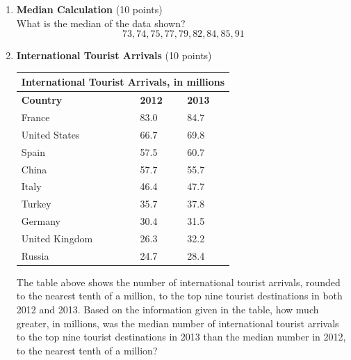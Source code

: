 \begin{enumerate}
  \newpage

  \item \textbf{Median Calculation} (10 points)\\
  What is the median of the data shown?\\
  $$73,74,75,77,79,82,84,85,91$$
  \begin{subanswer}
  \end{subanswer}

  \item \textbf{International Tourist Arrivals} (10 points)\\
  \begin{center}
  \begin{tabular}{|l|l|l|}
  \hline
  \multicolumn{3}{|c|}{International Tourist Arrivals, in millions} \\
  \hline
  \textbf{Country} & \textbf{2012} & \textbf{2013} \\
  \hline
  France & 83.0 & 84.7 \\
  \hline
  United States & 66.7 & 69.8 \\
  \hline
  Spain & 57.5 & 60.7 \\
  \hline
  China & 57.7 & 55.7 \\
  \hline
  Italy & 46.4 & 47.7 \\
  \hline
  Turkey & 35.7 & 37.8 \\
  \hline
  Germany & 30.4 & 31.5 \\
  \hline
  United Kingdom & 26.3 & 32.2 \\
  \hline
  Russia & 24.7 & 28.4 \\
  \hline
  \end{tabular}
  \end{center}

  The table above shows the number of international tourist arrivals, rounded to the nearest tenth of a million, to the top nine tourist destinations in both 2012 and 2013. Based on the information given in the table, how much greater, in millions, was the median number of international tourist arrivals to the top nine tourist destinations in 2013 than the median number in 2012, to the nearest tenth of a million?
  \begin{subanswer}
  \end{subanswer}


  \newpage


\end{enumerate}
